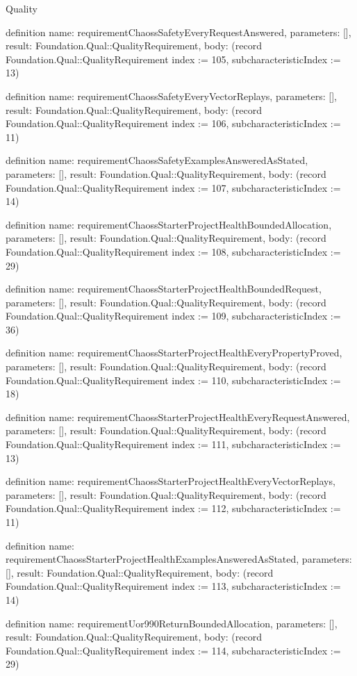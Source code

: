 \begin{lexlean}{Quality}
\begin{semanticmodule}
definition{
  name: requirementChaossSafetyEveryRequestAnswered,
  parameters: [],
  result: Foundation.Qual::QualityRequirement,
  body: (record Foundation.Qual::QualityRequirement {index := 105, subcharacteristicIndex := 13})
}

definition{
  name: requirementChaossSafetyEveryVectorReplays,
  parameters: [],
  result: Foundation.Qual::QualityRequirement,
  body: (record Foundation.Qual::QualityRequirement {index := 106, subcharacteristicIndex := 11})
}

definition{
  name: requirementChaossSafetyExamplesAnsweredAsStated,
  parameters: [],
  result: Foundation.Qual::QualityRequirement,
  body: (record Foundation.Qual::QualityRequirement {index := 107, subcharacteristicIndex := 14})
}

definition{
  name: requirementChaossStarterProjectHealthBoundedAllocation,
  parameters: [],
  result: Foundation.Qual::QualityRequirement,
  body: (record Foundation.Qual::QualityRequirement {index := 108, subcharacteristicIndex := 29})
}

definition{
  name: requirementChaossStarterProjectHealthBoundedRequest,
  parameters: [],
  result: Foundation.Qual::QualityRequirement,
  body: (record Foundation.Qual::QualityRequirement {index := 109, subcharacteristicIndex := 36})
}

definition{
  name: requirementChaossStarterProjectHealthEveryPropertyProved,
  parameters: [],
  result: Foundation.Qual::QualityRequirement,
  body: (record Foundation.Qual::QualityRequirement {index := 110, subcharacteristicIndex := 18})
}

definition{
  name: requirementChaossStarterProjectHealthEveryRequestAnswered,
  parameters: [],
  result: Foundation.Qual::QualityRequirement,
  body: (record Foundation.Qual::QualityRequirement {index := 111, subcharacteristicIndex := 13})
}

definition{
  name: requirementChaossStarterProjectHealthEveryVectorReplays,
  parameters: [],
  result: Foundation.Qual::QualityRequirement,
  body: (record Foundation.Qual::QualityRequirement {index := 112, subcharacteristicIndex := 11})
}

definition{
  name: requirementChaossStarterProjectHealthExamplesAnsweredAsStated,
  parameters: [],
  result: Foundation.Qual::QualityRequirement,
  body: (record Foundation.Qual::QualityRequirement {index := 113, subcharacteristicIndex := 14})
}

definition{
  name: requirementUor990ReturnBoundedAllocation,
  parameters: [],
  result: Foundation.Qual::QualityRequirement,
  body: (record Foundation.Qual::QualityRequirement {index := 114, subcharacteristicIndex := 29})
}


\end{semanticmodule}
\end{lexlean}
